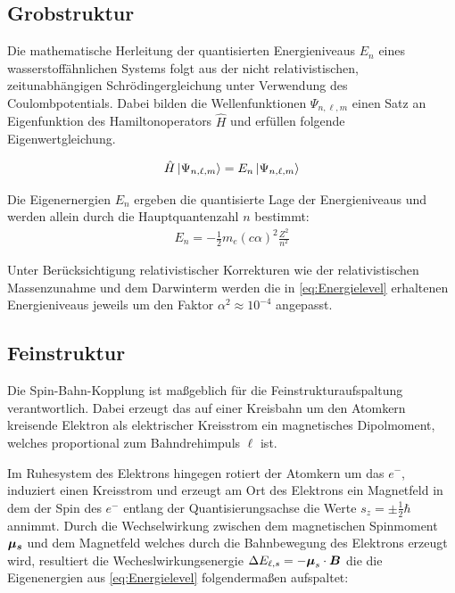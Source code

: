 \subsection{Grobstruktur}

\noindent Die mathematische Herleitung der quantisierten Energieniveaus ${E_{n}}$ eines wasserstoffähnlichen Systems folgt aus der nicht relativistischen, zeitunabhängigen Schrödingergleichung unter Verwendung des Coulombpotentials. Dabei bilden die Wellenfunktionen $\Psi_{n,\ell,m}$ einen Satz an Eigenfunktion des Hamiltonoperators $\hat{H}$ und erfüllen folgende Eigenwertgleichung.

\begin{align}
    \hat{H}\ket{\Psi_{n,\ell,m}}= E_{n}\ket{\Psi_{n,\ell,m}}
\end{align}

\noindent Die Eigenernergien ${E_{n}}$ ergeben die quantisierte Lage der Energieniveaus und werden allein durch die Hauptquantenzahl $n$ bestimmt:
\begin{align}
    E_{n} = - \frac{1}{2}m_{e}(c\alpha)^2\frac{Z^2}{n^2} \label{eq:Energielevel}
\end{align}

\noindent Unter Berücksichtigung relativistischer Korrekturen wie der relativistischen Massenzunahme und dem Darwinterm werden die in \eqref{eq:Energielevel} erhaltenen Energieniveaus jeweils um den Faktor $\alpha^2 \approx 10^{-4}$ angepasst. \cite{DemE4}\\

\subsection{Feinstruktur}

\noindent Die Spin-Bahn-Kopplung ist maßgeblich für die Feinstrukturaufspaltung verantwortlich. Dabei erzeugt das auf einer Kreisbahn um den Atomkern kreisende Elektron als elektrischer Kreisstrom ein magnetisches Dipolmoment, welches proportional zum Bahndrehimpuls $\ell$ ist.


\noindent Im Ruhesystem des Elektrons hingegen rotiert der Atomkern um das $e^{-}$, induziert einen Kreisstrom und erzeugt am Ort des Elektrons ein Magnetfeld in dem der Spin des $e^{-}$ entlang der Quantisierungsachse die Werte $s_{z} { = \pm \frac{1}{2}\hbar}$ annimmt. Durch die Wechselwirkung zwischen dem magnetischen Spinmoment $\boldsymbol{\mu_{s}}$ und dem Magnetfeld welches durch die Bahnbewegung des Elektrons erzeugt wird, resultiert die Wecheslwirkungsenergie $\Delta E_{\ell,s} = -\boldsymbol{\mu}_{s} \cdot \boldsymbol{B}$ die die Eigenenergien aus \eqref{eq:Energielevel} folgendermaßen aufspaltet:

